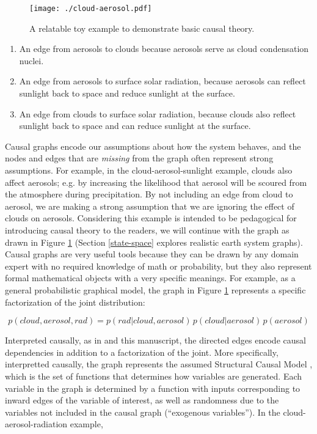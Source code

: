 \documentclass[12pt]{article}
\begin{document}
\begin{figure}
  \texttt{[image: ./cloud-aerosol.pdf]}\\
  \caption{A relatable toy example to demonstrate basic causal theory.}
  \label{fig:toy}
\end{figure}

\begin{enumerate}
\item An edge from aerosols to clouds because aerosols serve as cloud
  condensation nuclei.
\item An edge from aerosols to surface solar radiation, because
  aerosols can reflect sunlight back to space and reduce sunlight
  at the surface.
\item An edge from clouds to surface solar radiation, because clouds
  also reflect sunlight back to space and can reduce sunlight at
  the surface.
\end{enumerate}

Causal graphs encode our assumptions about how the system behaves, and
the nodes and edges that are \textit{missing} from the graph often
represent strong assumptions. For example, in the
cloud-aerosol-sunlight example, clouds also affect aerosols; e.g. by
increasing the likelihood that aerosol will be scoured from the
atmosphere during precipitation. By not including an edge from cloud
to aerosol, we are making a strong assumption that we are ignoring the
effect of clouds on aerosols. Considering this example is intended to
be pedagogical for introducing causal theory to the readers, we will
continue with the graph as drawn in Figure \ref{fig:toy} (Section
\ref{state-space} explores realistic earth system graphs). Causal
graphs are very useful tools because they can be drawn by any domain
expert with no required knowledge of math or probability, but they
also represent formal mathematical objects with a very specific
meanings. For example, as a general probabilistic graphical model, the
graph in Figure \ref{fig:toy} represents a specific factorization of
the joint distribution:

\begin{equation}
  p(cloud, aerosol, rad) = p(rad | cloud, aerosol) \, p(cloud |
  aerosol) \,
  p(aerosol)
\end{equation}

Interpreted causally, as in \citet{pearl1995causal} and this
manuscript, the directed edges encode causal dependencies in addition
to a factorization of the joint. More specifically, interpretted
causally, the graph represents the assumed Structural Causal Model
\citet[SCM,][]{pearl2009}, which is the set of functions that
determines how variables are generated. Each variable in the graph is
determined by a function with inputs corresponding to inward edges of
the variable of interest, as well as randomness due to the variables
not included in the causal graph (``exogenous variables'').  In the
cloud-aerosol-radiation example,
\end{document}
